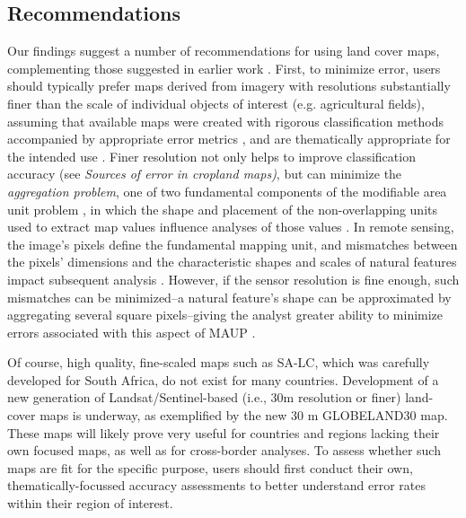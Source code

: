 \documentclass[12 pt, titlepage, a4paper]{article}
\begin{document}
\subsection*{Recommendations}
\vspace{-0.2 cm}
Our findings suggest a number of recommendations for using land cover maps, complementing those suggested in earlier work \citep{verburg_challenges_2011}. First, to minimize error, users should typically prefer maps derived from imagery with resolutions substantially finer than the scale of individual objects of interest (e.g. agricultural fields), assuming that available maps were created with rigorous classification methods accompanied by appropriate error metrics \citep{olofsson_good_2014}, and are thematically appropriate for the intended use \citep{verburg_challenges_2011}. Finer resolution not only helps to improve classification accuracy (see \emph{Sources of error in cropland maps)}, but can minimize the \emph{aggregation problem}, one of two fundamental components of the modifiable area unit problem \citep[MAUP; ][]{openshaw_million_1979}, in which the shape and placement of the non-overlapping units used to extract map values influence analyses of those values \citep{dark_modifiable_2007, marceau_scale_1999}. In remote sensing, the image's pixels define the fundamental mapping unit, and mismatches between the pixels' dimensions and the characteristic shapes and scales of natural features impact subsequent analysis \citep{dark_modifiable_2007}. However, if the sensor resolution is fine enough, such mismatches can be minimized--a natural feature's shape can be approximated by aggregating several square pixels--giving the analyst greater ability to minimize errors associated with this aspect of MAUP \citep{dark_modifiable_2007, hay_comparison_2003}. 

Of course, high quality, fine-scaled maps such as SA-LC, which was carefully developed for South Africa, do not exist for many countries. Development of a new generation of Landsat/Sentinel-based (i.e., 30m resolution or finer) land-cover maps is underway, as exemplified by the new 30 m GLOBELAND30 map. These maps will likely prove very useful for countries and regions lacking their own focused maps, as well as for cross-border analyses. To assess whether such maps are fit for the specific purpose, users should first conduct their own, thematically-focussed accuracy assessments to better understand error rates within their region of interest. %
\end{document}
